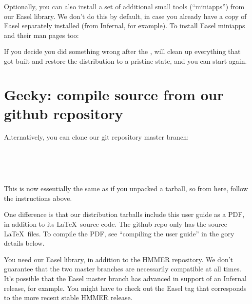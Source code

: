   \vspace{1ex}
  \vspace{1ex}

Optionally, you can also install a set of additional small tools
(``miniapps'') from our Easel library.  We don't do this by default,
in case you already have a copy of Easel separately installed (from
Infernal, for example). To install Easel miniapps and their man pages
too:

  \vspace{1ex}
  \vspace{1ex}

If you decide you did something wrong after the ,
 will clean up everything that got built and
restore the distribution to a pristine state, and you can start again.


\section{Geeky: compile source from our github repository}

Alternatively, you can clone our git repository master
branch:
  
  \vspace{1ex}
   \\
   \\
   \\
  \vspace{1ex}

This is now essentially the same as if you unpacked a tarball, so from
here, follow the  instructions above.

One difference is that our distribution tarballs include this user
guide as a PDF, in addition to its \LaTeX\ source code. The github
repo only has the source \LaTeX\ files. To compile the PDF, see
``compiling the user guide'' in the gory details below.

You need our Easel library, in addition to the HMMER repository. We
don't guarantee that the two master branches are necessarily
compatible at all times. It's possible that the Easel master branch
has advanced in support of an Infernal release, for example. You might
have to check out the Easel tag that corresponds to the more recent
stable HMMER release. 

